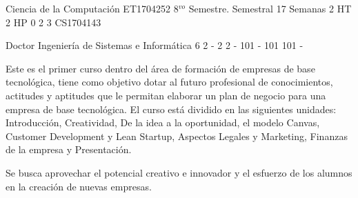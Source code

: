 \documentclass[a4paper,8pt]{article}
\begin{document}
\setNombreProfesor{}
\setGradoProfesorAbreviado{}
\sylabusHeader

\academicaTable
{Ciencia de la Computación} %
{ET1704252} %
{8$^{vo}$ Semestre.} %
{Semestral} %
{17 Semanas} %
{2 HT} %
{2 HP} %
{0} %
{}  %
{2} %
{3} %
{CS1704143} %

\administrativaTable
{Doctor} %
{Ingeniería de Sistemas e Informática} %
{6} %
{2} %
{-} %
{2} %
{2} %
{-} %
{101} %
{-} %
{101} %
{101} %
{-} %


\begin{fundamentacion}
Este es el primer curso dentro del área de formación de empresas de
base tecnológica, tiene como objetivo dotar al futuro profesional 
de conocimientos, actitudes y aptitudes que le
permitan elaborar un plan de negocio para una empresa de base tecnológica.
El curso está dividido en las siguientes unidades:
Introducción, Creatividad, De la idea a la oportunidad, el modelo Canvas, Customer Development y Lean Startup, Aspectos Legales y Marketing, Finanzas de la empresa y Presentación.

Se busca aprovechar el potencial creativo e innovador y el esfuerzo de los alumnos en la creación de nuevas empresas.

\end{fundamentacion}

\begin{sumilla}
\item 
\item 
\item 
\item 
\item 
\item 
\item 
\item 

\end{sumilla}
\end{document}
